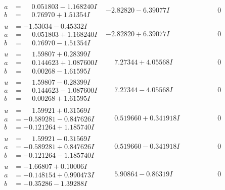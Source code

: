 \documentclass[1p]{elsarticle_modified}
\theoremstyle{definition}
\begin{document}
$$\begin{array}{c|c|c}
\begin{aligned}
a &= \phantom{-}0.051803 - 1.168240 I \\
b &= \phantom{-}0.76970 + 1.51354 I\end{aligned}
 & -2.82820 - 6.39077 I & \phantom{-0.000000 } 0 \\ \hline\begin{aligned}
u &= -1.53034 - 0.45332 I \\
a &= \phantom{-}0.051803 + 1.168240 I \\
b &= \phantom{-}0.76970 - 1.51354 I\end{aligned}
 & -2.82820 + 6.39077 I & \phantom{-0.000000 } 0 \\ \hline\begin{aligned}
u &= \phantom{-}1.59807 + 0.28399 I \\
a &= \phantom{-}0.144623 + 1.087600 I \\
b &= \phantom{-}0.00268 - 1.61595 I\end{aligned}
 & \phantom{-}7.27344 + 4.05568 I & \phantom{-0.000000 } 0 \\ \hline\begin{aligned}
u &= \phantom{-}1.59807 - 0.28399 I \\
a &= \phantom{-}0.144623 - 1.087600 I \\
b &= \phantom{-}0.00268 + 1.61595 I\end{aligned}
 & \phantom{-}7.27344 - 4.05568 I & \phantom{-0.000000 } 0 \\ \hline\begin{aligned}
u &= \phantom{-}1.59921 + 0.31569 I \\
a &= -0.589281 - 0.847626 I \\
b &= -0.121264 + 1.185740 I\end{aligned}
 & \phantom{-}0.519660 + 0.341918 I & \phantom{-0.000000 } 0 \\ \hline\begin{aligned}
u &= \phantom{-}1.59921 - 0.31569 I \\
a &= -0.589281 + 0.847626 I \\
b &= -0.121264 - 1.185740 I\end{aligned}
 & \phantom{-}0.519660 - 0.341918 I & \phantom{-0.000000 } 0 \\ \hline\begin{aligned}
u &= -1.66807 + 0.10006 I \\
a &= -0.148154 + 0.990473 I \\
b &= -0.35286 - 1.39288 I\end{aligned}
 & \phantom{-}5.90864 - 0.86319 I & \phantom{-0.000000 } 0 \\ \hline\begin{aligned}

\end{aligned}
\end{array}$$
\end{document}
